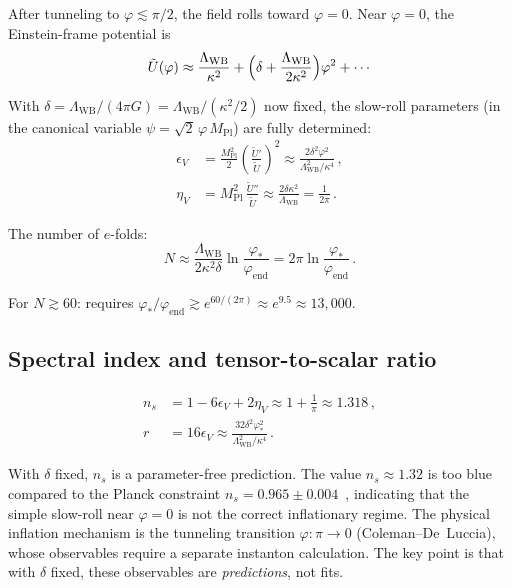 \documentclass[aps,prd,twocolumn,superscriptaddress,nofootinbib]{revtex4-2}
\newcommand{\Mpl}{M_{\mathrm{Pl}}}
\newcommand{\Lw}{\Lambda_{\mathrm{WB}}}
\begin{document}
After tunneling to $\varphi \lesssim \pi/2$,
the field rolls toward $\varphi = 0$.
Near $\varphi = 0$, the Einstein-frame potential is
\begin{equation}
  \tilde{U}(\varphi) \approx \frac{\Lw}{\kappa^2}
  + \Bigl(\delta + \frac{\Lw}{2\kappa^2}\Bigr)\varphi^2 + \cdots
\end{equation}

With $\delta = \Lw/(4\pi G) = \Lw/({\kappa^2}/{2})$
now fixed, the slow-roll parameters (in the canonical variable
$\psi = \sqrt{2}\,\varphi\,\Mpl$) are fully determined:
\begin{align}
  \epsilon_V &= \frac{\Mpl^2}{2}
  \left(\frac{\tilde{U}'}{\tilde{U}}\right)^2
  \approx \frac{2\delta^2\varphi^2}{\Lw^2/\kappa^4}\,,
  \\
  \eta_V &= \Mpl^2\,\frac{\tilde{U}''}{\tilde{U}}
  \approx \frac{2\delta\kappa^2}{\Lw}
  = \frac{1}{2\pi}\,.
\end{align}

The number of $e$-folds:
\begin{equation}
  N \approx \frac{\Lw}{2\kappa^2\delta}
  \ln\frac{\varphi_*}{\varphi_{\mathrm{end}}}
  = 2\pi\ln\frac{\varphi_*}{\varphi_{\mathrm{end}}}\,.
\end{equation}

For $N \gtrsim 60$: requires
$\varphi_*/\varphi_{\mathrm{end}} \gtrsim e^{60/(2\pi)} \approx e^{9.5} \approx 13{,}000$.

\subsection{Spectral index and tensor-to-scalar ratio}

\begin{align}
  n_s &= 1 - 6\epsilon_V + 2\eta_V
  \approx 1 + \frac{1}{\pi}
  \approx 1.318\,,
  \label{eq:ns}
  \\
  r &= 16\epsilon_V
  \approx \frac{32\delta^2\varphi_*^2}{\Lw^2/\kappa^4}\,.
  \label{eq:r}
\end{align}

With $\delta$ fixed, $n_s$ is a parameter-free prediction.
The value $n_s \approx 1.32$ is too blue compared to
the Planck constraint $n_s = 0.965 \pm 0.004$~\cite{Planck2018},
indicating that the simple slow-roll near $\varphi = 0$ is
not the correct inflationary regime.
The physical inflation mechanism is the
tunneling transition $\varphi: \pi \to 0$
(Coleman--De~Luccia), whose observables require a
separate instanton calculation.
The key point is that with $\delta$ fixed,
these observables are \emph{predictions},
not fits.
\end{document}
